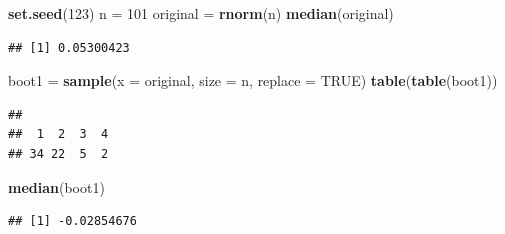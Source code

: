 \documentclass[10pt,ignorenonframetext,]{beamer}
\newenvironment{Shaded}{\begin{snugshade}}{\end{snugshade}}
\newcommand{\KeywordTok}[1]{\textcolor[rgb]{0.13,0.29,0.53}{\textbf{#1}}}
\newcommand{\DataTypeTok}[1]{\textcolor[rgb]{0.13,0.29,0.53}{#1}}
\newcommand{\DecValTok}[1]{\textcolor[rgb]{0.00,0.00,0.81}{#1}}
\newcommand{\StringTok}[1]{\textcolor[rgb]{0.31,0.60,0.02}{#1}}
\newcommand{\OtherTok}[1]{\textcolor[rgb]{0.56,0.35,0.01}{#1}}
\newcommand{\NormalTok}[1]{#1}
\begin{document}
\begin{frame}[fragile]

\small

\begin{Shaded}
\begin{Highlighting}[]
\KeywordTok{set.seed}\NormalTok{(}\DecValTok{123}\NormalTok{)}
\NormalTok{n =}\StringTok{ }\DecValTok{101}
\NormalTok{original =}\StringTok{ }\KeywordTok{rnorm}\NormalTok{(n)}
\KeywordTok{median}\NormalTok{(original)}
\end{Highlighting}
\end{Shaded}

\begin{verbatim}
## [1] 0.05300423
\end{verbatim}

\begin{Shaded}
\begin{Highlighting}[]
\NormalTok{boot1 =}\StringTok{ }\KeywordTok{sample}\NormalTok{(}\DataTypeTok{x =}\NormalTok{ original, }\DataTypeTok{size =}\NormalTok{ n, }\DataTypeTok{replace =} \OtherTok{TRUE}\NormalTok{)}
\KeywordTok{table}\NormalTok{(}\KeywordTok{table}\NormalTok{(boot1))}
\end{Highlighting}
\end{Shaded}

\begin{verbatim}
## 
##  1  2  3  4 
## 34 22  5  2
\end{verbatim}

\begin{Shaded}
\begin{Highlighting}[]
\KeywordTok{median}\NormalTok{(boot1)}
\end{Highlighting}
\end{Shaded}

\begin{verbatim}
## [1] -0.02854676
\end{verbatim}

\end{frame}
\end{document}
